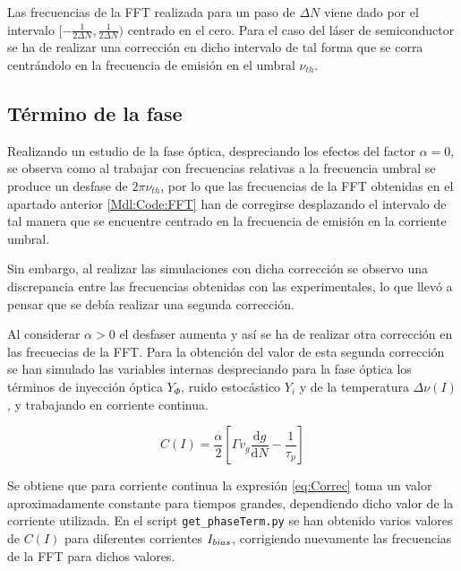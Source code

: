 		Las frecuencias de la FFT realizada para un paso de $\Delta N$ viene dado por el intervalo $[-\frac{1}{2\Delta N}, \frac{1}{2\Delta N})$ centrado en el cero. Para el caso del l\'aser de semiconductor se ha de realizar una correcci\'on en dicho intervalo de tal forma que se corra centr\'andolo en la frecuencia de emisi\'on en el umbral $\nu_{th}$. 

	\subsection{T\'ermino de la fase}
		\label{Mdl:Code:Temp}

		Realizando un estudio de la fase \'optica, despreciando los efectos del factor $\alpha =0$, se observa como al trabajar con frecuencias relativas a la frecuencia umbral se produce un desfase de $2\pi \nu_{th}$, por lo que las frecuencias de la FFT obtenidas en el apartado anterior \ref{Mdl:Code:FFT} han de corregirse desplazando el intervalo de tal manera que se encuentre centrado en la frecuencia de emisi\'on en la corriente umbral.

		Sin embargo, al realizar las simulaciones con dicha correcci\'on se observo una discrepancia entre las frecuencias obtenidas con las experimentales, lo que llev\'o a pensar que se deb\'ia realizar una segunda correcci\'on.

		Al considerar $\alpha > 0$ el desfaser aumenta y as\'i se ha de realizar otra correcci\'on en las frecuecias de la FFT. Para la obtenci\'on del valor de esta segunda correcci\'on se han simulado las variables internas despreciando para la fase \'optica los t\'erminos de inyecci\'on \'optica $Y_{\Phi}$, ruido estoc\'astico $Y_i$ y de la temperatura $\Delta \nu(I)$, y trabajando en corriente continua.

			\begin{equation}
				C (I) = \frac{\alpha}{2} \left[ \Gamma v_g \frac{\mathrm{d} g}{\mathrm{d} N} - \frac{1}{\tau_p} \right]
				\label{eq:Correc}
			\end{equation}

			Se obtiene que para corriente continua la expresi\'on \ref{eq:Correc} toma un valor aproximadamente constante para tiempos grandes, dependiendo dicho valor de la corriente utilizada. En el script \texttt{get\_phaseTerm.py} se han obtenido varios valores de $C(I)$ para diferentes corrientes $I_{bias}$, corrigiendo nuevamente las frecuencias de la FFT para dichos valores.
		
